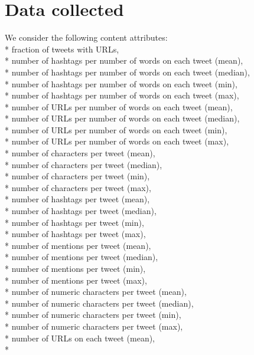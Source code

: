 \documentclass[11pt]{article}
\begin{document}
\section{Data collected}
	We consider the following content attributes: \\*
	\newline
fraction of tweets with URLs, \\*
number of hashtags per number of words on each tweet (mean), \\*
number of hashtags per number of words on each tweet (median), \\*
number of hashtags per number of words on each tweet (min), \\*
number of hashtags per number of words on each tweet (max), \\*
number of URLs per number of words on each tweet (mean), \\*
number of URLs per number of words on each tweet (median), \\*
number of URLs per number of words on each tweet (min), \\*
number of URLs per number of words on each tweet (max), \\*
number of characters per tweet (mean), \\*
number of characters per tweet (median), \\*
number of characters per tweet (min), \\*
number of characters per tweet (max), \\*
number of hashtags per tweet (mean), \\*
number of hashtags per tweet (median), \\*
number of hashtags per tweet (min), \\*
number of hashtags per tweet (max), \\*
number of mentions per tweet (mean), \\*
number of mentions per tweet (median),\\*
number of mentions per tweet (min),\\*
number of mentions per tweet (max),\\*
number of numeric characters per tweet (mean),\\*
number of numeric characters per tweet (median),\\*
number of numeric characters per tweet (min),\\*
number of numeric characters per tweet (max),\\*
number of URLs on each tweet (mean),\\*
\end{document}
